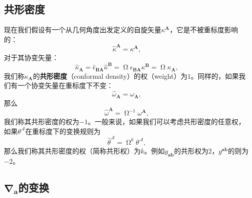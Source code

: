 \subsection{共形密度}

现在我们假设有一个从几何角度出发定义的自旋矢量$\kappa ^{\boldsymbol{A}}$，它是不被重标度影响的：
\begin{equation*}
	\hat{\kappa }^{\boldsymbol{A}} =\kappa ^{\boldsymbol{A}} ,
\end{equation*}
对于其协变矢量：
\begin{equation*}
	\hat{\kappa }_{\boldsymbol{A}} =\hat{\epsilon }_{\boldsymbol{BA}}\hat{\kappa }^{\boldsymbol{B}} =\upOmega\epsilon _{\boldsymbol{BA}} \kappa ^{\boldsymbol{B}} =\upOmega\kappa _{\boldsymbol{A}} ,
\end{equation*}
我们称$\kappa _{\boldsymbol{A}}$的\textbf{共形密度}（conformal density）的权（weight）为$1$。同样的，如果我们有一个协变矢量在重标度下不变：
\begin{equation*}
	\hat{\omega }_{\boldsymbol{A}} =\omega _{\boldsymbol{A}} ,
\end{equation*}
那么
\begin{equation*}
	\hat{\omega }^{\boldsymbol{A}} =\upOmega^{-1} \omega ^{\boldsymbol{A}} ,
\end{equation*}
我们称其共形密度的权为$-1$。一般来说，如果我们可以考虑共形密度的任意权，如果$\theta ^{\mathcal{A}}$在重标度下的变换规则为
\begin{equation*}
	\hat{\theta }^{\mathcal{A}} =\upOmega^{k} \theta ^{\mathcal{A}} ,
\end{equation*}
那么我们称其共形密度的权（简称共形权）为$k$。例如$g_{\boldsymbol{ab}}$的共形权为$2$，$g^{\boldsymbol{ab}}$的则为$-2$。


\subsection{$\boldsymbol{\nabla }_{\boldsymbol{a}}$的变换}

